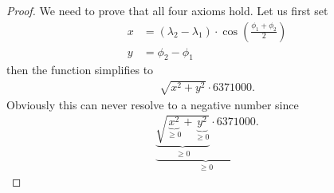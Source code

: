 	\begin{proof}
		We need to prove that all four axioms hold. Let us first set
		\begin{align*}
			x	&= \left(\lambda_2 - \lambda_1\right) \cdot \cos\left(\frac{\phi_1 + \phi_2}{2}\right)\\
			y	&= \phi_2 - \phi_1
		\end{align*}
		then the function simplifies to
		\begin{align*}
			\sqrt{x^2 + y^2} \cdot 6371000.
		\end{align*}
		Obviously this can never resolve to a negative number since
		\begin{align*}
			\underbrace{\underbrace{\sqrt{\underbrace{x^2}_{\ge 0} + \underbrace{y^2}_{\ge 0}}}_{\ge 0} \cdot 6371000}_{\ge 0}.
		\end{align*}
		

\end{proof}
